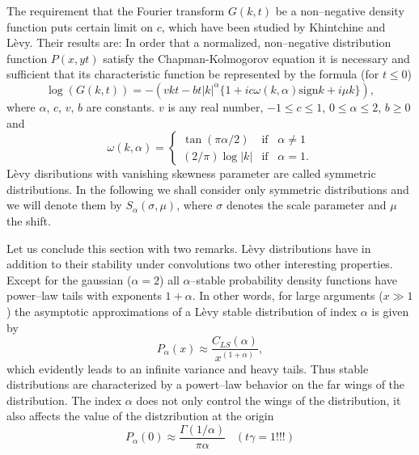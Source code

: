The requirement that the Fourier transform $G(k,t)$ be a non--negative 
density function puts certain limit on $c$, which have been studied by
Khintchine and L\`evy. Their results are: In order that a normalized,
non--negative distribution function $P(x,yt)$ satisfy the Chapman-Kolmogorov 
equation it is necessary and sufficient that its characteristic function be
represented by the formula (for $t \le 0$)
\begin{displaymath}
  \log (G(k,t)) = -(vkt -bt |k|^{\alpha} 
                 \{ 1 + ic\omega(k,\alpha) \mbox{sign}k + i \mu k\}),
\end{displaymath}
where $\alpha$, $c$, $v$, $b$ are constants. $v$ is any real number, 
$-1 \le c \le 1$, $0 \le \alpha \le 2$, $b \ge 0$ and 
\begin{displaymath}
  \omega(k,\alpha) = \left \{
               \begin{array}{ll}
                \tan(\pi \alpha /2) & \mbox{if} \;\;\; \alpha \neq 1 \\
                 (2/\pi) \log|k| &    \mbox{if} \;\;\; \alpha =1.
                 \end{array}
                     \right.
\end{displaymath}
L\`evy disributions with vanishing skewness parameter are called symmetric
distributions. In the following we shall consider only symmetric distributions
and we will denote them by $S_{\alpha}(\sigma,\mu)$, where $\sigma$ denotes
the scale parameter  and $\mu$   the shift.       


Let us conclude this section with two remarks. L\`evy distributions have in
addition to their stability under convolutions two other interesting
properties. Except for the gaussian ($\alpha = 2$) all $\alpha$--stable
probability density functions have power--law tails with exponents 
$1 + \alpha$. In other words, for large arguments ($x \gg 1$) the asymptotic
approximations of a L\`evy stable distribution of index $\alpha$ is given by
\begin{displaymath}
  P_{\alpha}(x) \approx \frac{C_{LS}(\alpha)}{x^{(1 + \alpha)}},
\end{displaymath}
which evidently leads to an infinite variance and heavy tails. Thus stable
distributions are characterized by a powert--law behavior on the far wings of
the distribution. The index $\alpha$ does not only control the wings of the
distribution, it also affects the value of the distzribution at the origin
\begin{displaymath}
  P_{\alpha}(0) \approx \frac{\Gamma(1 / \alpha)}{\pi \alpha} \;\;\; 
(t \gamma =1!!!)
\end{displaymath}

